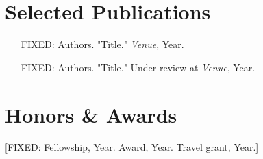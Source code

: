 \documentclass[11pt,letterpaper]{article}
\begin{document}
\section{Selected Publications}
\begin{enumerate}[leftmargin=1.4em,topsep=2pt,itemsep=2pt]
  \item [FIXED: Authors. "Title." \textit{Venue}, Year.]
  \item [FIXED: Authors. "Title." Under review at \textit{Venue}, Year.]
\end{enumerate}

\section{Honors \& Awards}
[FIXED: Fellowship, Year. Award, Year. Travel grant, Year.]
\end{document}
